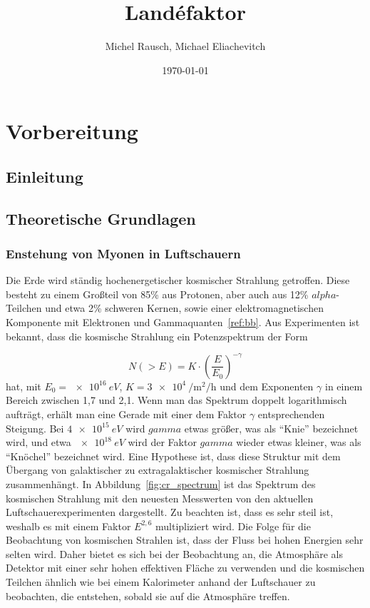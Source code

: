 \documentclass[a4paper,ngerman]{scrartcl}
\title{Landéfaktor}
\date{\today}
\author{Michel Rausch, Michael Eliachevitch}
\begin{document}
\maketitle
\tableofcontents
\newpage

\section{Vorbereitung}

\subsection{Einleitung}
\label{sec:einfuhrung}


\subsection{Theoretische Grundlagen}
\label{sec:theorie}

\subsubsection{Enstehung von Myonen in Luftschauern}
\label{sec:luftschauer}

Die Erde wird ständig hochenergetischer kosmischer Strahlung getroffen. 
Diese besteht zu einem Großteil von 85\% aus Protonen, aber auch aus 12\% $alpha$-Teilchen und etwa 2\% schweren Kernen,
sowie einer elektromagnetischen Komponente mit Elektronen und Gammaquanten~\ref{ref:bb}.
Aus Experimenten ist bekannt, dass die kosmische Strahlung ein Potenzspektrum der Form

\begin{equation}
  N(> E) = K \cdot \left(\frac{E}{E_0}\right)^{-\gamma}
  \label{eq:powerlaw}
\end{equation}
hat, mit $E_0 = \SI{e16}{eV}$, $K = \SI{3e4}{\per\square\meter\per\hour}$ und dem Exponenten $\gamma$ in einem Bereich zwischen 1,7 und 2,1.
Wenn man das Spektrum doppelt logarithmisch aufträgt, erhält man eine Gerade mit einer dem Faktor $\gamma$ entsprechenden Steigung.
Bei $\SI{4e15}{eV}$ wird $gamma$ etwas größer, was als "`Knie"' bezeichnet wird, und etwa $\SI{e18}{eV}$ wird der Faktor $gamma$ wieder etwas kleiner, was als "`Knöchel"' bezeichnet wird. Eine Hypothese ist, dass diese Struktur mit dem Übergang von galaktischer zu extragalaktischer kosmischer Strahlung zusammenhängt. In Abbildung~\ref{fig:cr_spectrum} ist das Spektrum des kosmischen Strahlung mit den neuesten Messwerten von den aktuellen Luftschauerexperimenten dargestellt. Zu beachten ist, dass es sehr steil ist, weshalb es mit einem Faktor $E^{2,6}$ multipliziert wird. Die Folge für die Beobachtung von kosmischen Strahlen ist, dass der Fluss bei hohen Energien sehr selten wird. Daher bietet es sich bei der
Beobachtung an, die Atmosphäre als Detektor mit einer sehr hohen effektiven Fläche zu verwenden und die kosmischen Teilchen ähnlich wie bei einem Kalorimeter anhand der Luftschauer zu beobachten, die entstehen, sobald sie auf die Atmosphäre treffen.
 
\end{document}
